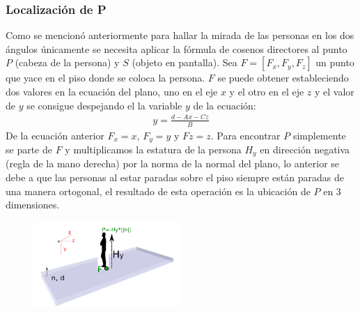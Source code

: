       \subsubsection{Localización de P}
	    Como se mencionó anteriormente para hallar la mirada de las personas en los dos ángulos únicamente se necesita aplicar la fórmula de cosenos directores al punto $P$ (cabeza de la persona) y $S$ (objeto en pantalla).
      Sea $F=[F_x, F_y, F_z]$ un punto que yace en el piso donde se coloca la persona. $F$ se puede obtener estableciendo dos valores en la ecuación del plano, uno en el eje $x$ y el otro en el eje $z$ y el valor de $y$ se consigue despejando el la variable $y$ de la ecuación:
        \begin{eqnarray}
        y=\frac{d-Ax-Cz}{B}
        \end{eqnarray}
      De la ecuación anterior $F_x=x$, $F_y=y$ y $Fz=z$. Para encontrar $P$ simplemente se parte de $F$ y multiplicamos la estatura de la persona $H_y$ en dirección negativa (regla de la mano derecha) por la norma de la normal del plano, lo anterior se debe a que las personas al estar paradas sobre el piso siempre están paradas de una manera ortogonal, el resultado de esta operación es la ubicación de $P$ en 3 dimensiones.\\
      \begin{figure}[htbp]
       	\centering
       	\includegraphics[width=0.5\textwidth]{./pictures/calculoP}
       	\caption{}\label{fig: figura}
      \end{figure}

